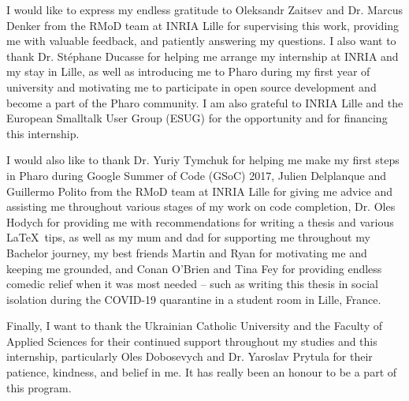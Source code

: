 \documentclass[
11pt, %
english, %
singlespacing, %
headsepline, %
oneside,]{BachelorMasterThesis} %
\begin{document}

\begin{acknowledgements}
\addchaptertocentry{\acknowledgementname} %
I would like to express my endless gratitude to Oleksandr Zaitsev and Dr. Marcus Denker from the RMoD team at INRIA Lille for supervising this work, providing me with valuable feedback, and patiently answering my questions. I also want to thank Dr. Stéphane Ducasse for helping me arrange my internship at INRIA and my stay in Lille, as well as introducing me to Pharo during my first year of university and motivating me to participate in open source development and become a part of the Pharo community. I am also grateful to INRIA Lille and the European Smalltalk User Group (ESUG) for the opportunity and for financing this internship.

I would also like to thank Dr. Yuriy Tymchuk for helping me make my first steps in Pharo during Google Summer of Code (GSoC) 2017, Julien Delplanque and Guillermo Polito from the RMoD team at INRIA Lille for giving me advice and assisting me throughout various stages of my work on code completion, Dr. Oles Hodych for providing me with recommendations for writing a thesis and various \LaTeX\  tips, as well as my mum and dad for supporting me throughout my Bachelor journey, my best friends Martin and Ryan for motivating me and keeping me grounded, and Conan O'Brien and Tina Fey for providing endless comedic relief when it was most needed -- such as writing this thesis in social isolation during the COVID-19 quarantine in a student room in Lille, France.

Finally, I want to thank the Ukrainian Catholic University and the Faculty of Applied Sciences for their continued support throughout my studies and this internship, particularly Oles Dobosevych and Dr. Yaroslav Prytula for their patience, kindness, and belief in me. It has really been an honour to be a part of this program.
\end{acknowledgements}


\tableofcontents %
\end{document}
